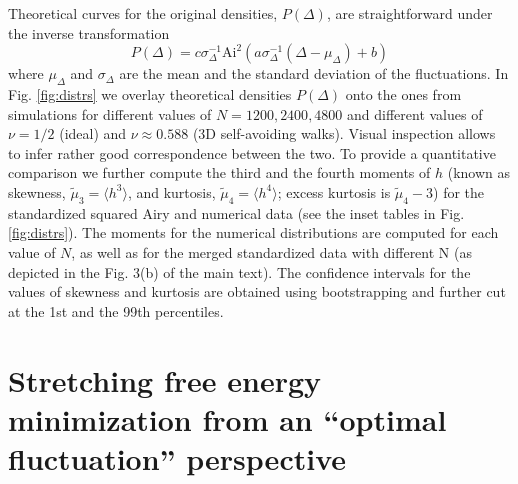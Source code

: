 \documentclass[aps,pre,floatfix,twocolumn,nofootinbib]{revtex4-2}
\newcommand{\be}{\begin{equation}}
\newcommand{\ee}{\end{equation}}
\begin{document}
Theoretical curves for the original densities, $P(\Delta)$, are straightforward under the inverse transformation
\be
P(\Delta)=c\sigma_\Delta^{-1}\mathrm{Ai}^2\left(a\sigma_\Delta^{-1}(\Delta-\mu_\Delta) + b\right)
\label{rescaled_airy}
\ee
where $\mu_\Delta$ and $\sigma_\Delta$ are the mean and the standard deviation of the fluctuations. In Fig. \ref{fig:distrs} we overlay theoretical densities
$P(\Delta)$ onto the ones from simulations for different values of $N=1200,2400,4800$ and different values of $\nu=1/2$ (ideal) and $\nu \approx 0.588$ (3D self-avoiding walks). Visual inspection allows to infer rather good correspondence between the two. To provide a quantitative comparison we further compute the third and the fourth moments of $h$ (known as skewness, ${\tilde{\mu}}_3=\langle h^3 \rangle$, and kurtosis, ${\tilde{\mu}}_4=\langle h^4 \rangle$; excess kurtosis is ${\tilde{\mu}}_4-3$) for the standardized squared Airy and numerical data (see the inset tables in Fig. \ref{fig:distrs}). The moments for the numerical distributions are computed for each value of $N$, as well as for the merged standardized data with different N (as depicted in the Fig. 3(b) of the main text). The confidence intervals for the values of skewness and kurtosis are obtained using bootstrapping and further cut at the 1st and the 99th percentiles.


\section{Stretching free energy minimization from an ``optimal fluctuation'' perspective}\label{app_bv}
\end{document}
